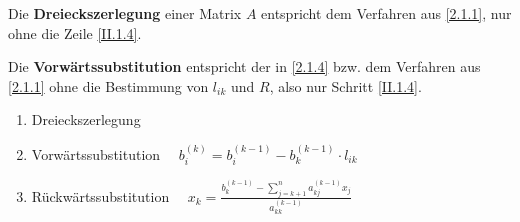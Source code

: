 \begin{Defe}
  \label{2.1.5}
  Die \textbf{Dreieckszerlegung} einer Matrix $A$
  entspricht dem Verfahren aus \ref{2.1.1}, nur ohne die Zeile \eqref{II.1.4}.
\end{Defe}



\begin{Defe}
  Die \textbf{Vorwärtssubstitution} entspricht der in \ref{2.1.4}
  bzw. dem Verfahren aus \ref{2.1.1} 
  ohne die Bestimmung von $l_{ik}$ und $R$, also nur Schritt \eqref{II.1.4}.
\end{Defe}

\begin{framed}
  \begin{enumerate}[1]
  \item Dreieckszerlegung
  \item Vorwärtssubstitution        $\quad b_i^{(k)} = b_i^{(k-1)} -b_k^{(k-1)} \cdot   l_{ik} $
  \item Rückwärtssubstitution      $\quad x_k = \frac{b_k^{(k-1)}-\sum_{j=k+1}^{n}a_{kj}^{(k-1)}x_j}{a_{kk}^{(k-1)}}$
  \end{enumerate}
\end{framed}

